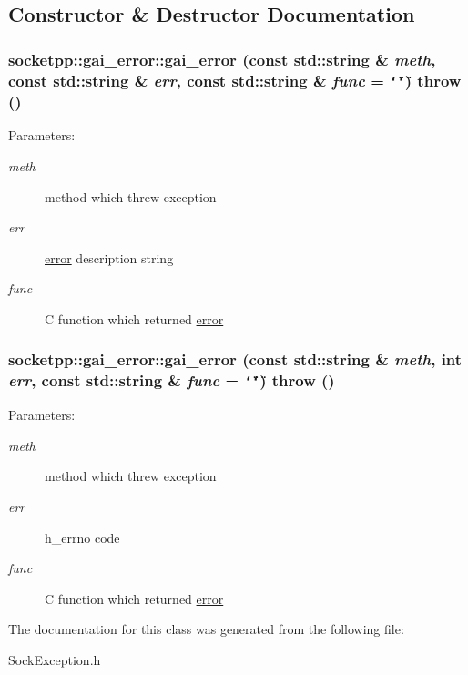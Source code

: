 \subsection{Constructor \& Destructor Documentation}
\hypertarget{classsocketpp_1_1gai__error_617e195448875097f6561a39cca1f49b}{
\subsubsection[{gai\_\-error}]{\setlength{\rightskip}{0pt plus 5cm}socketpp::gai\_\-error::gai\_\-error (const std::string \& {\em meth}, \/  const std::string \& {\em err}, \/  const std::string \& {\em func} = {\tt \char`\"{}\char`\"{}})  throw ()}}
\label{classsocketpp_1_1gai__error_617e195448875097f6561a39cca1f49b}


\begin{Desc}
\item[Parameters:]
\begin{description}
\item[{\em meth}]method which threw exception \item[{\em err}]\hyperlink{classsocketpp_1_1error}{error} description string \item[{\em func}]C function which returned \hyperlink{classsocketpp_1_1error}{error} \end{description}
\end{Desc}
\hypertarget{classsocketpp_1_1gai__error_fc03a724180e0edd90f7502eedb68da1}{
\subsubsection[{gai\_\-error}]{\setlength{\rightskip}{0pt plus 5cm}socketpp::gai\_\-error::gai\_\-error (const std::string \& {\em meth}, \/  int {\em err}, \/  const std::string \& {\em func} = {\tt \char`\"{}\char`\"{}})  throw ()}}
\label{classsocketpp_1_1gai__error_fc03a724180e0edd90f7502eedb68da1}


\begin{Desc}
\item[Parameters:]
\begin{description}
\item[{\em meth}]method which threw exception \item[{\em err}]h\_\-errno code \item[{\em func}]C function which returned \hyperlink{classsocketpp_1_1error}{error} \end{description}
\end{Desc}


The documentation for this class was generated from the following file:\begin{CompactItemize}
\item 
SockException.h\end{CompactItemize}
